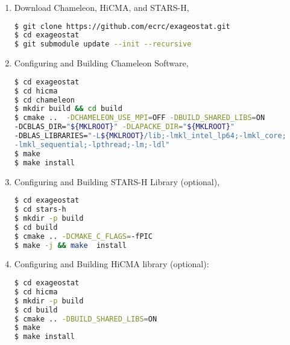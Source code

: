 \documentclass[
10pt, %
a4paper, %
oneside, %
headinclude,footinclude, %
BCOR5mm, %
]{scrartcl}
\begin{document}
\begin{enumerate}
%


\item
\noindent Download Chameleon, HiCMA, and STARS-H,
\begin{lstlisting}[language=bash]
$ git clone https://github.com/ecrc/exageostat.git
$ cd exageostat
$ git submodule update --init --recursive
\end{lstlisting}

\item
\noindent Configuring and Building Chameleon Software,
\begin{lstlisting}[language=bash]
$ cd exageostat
$ cd hicma
$ cd chameleon
$ mkdir build && cd build
$ cmake ..  -DCHAMELEON_USE_MPI=OFF -DBUILD_SHARED_LIBS=ON 
-DCBLAS_DIR="${MKLROOT}" -DLAPACKE_DIR="${MKLROOT}"
-DBLAS_LIBRARIES="-L${MKLROOT}/lib;-lmkl_intel_lp64;-lmkl_core; 
-lmkl_sequential;-lpthread;-lm;-ldl"
$ make 
$ make install
\end{lstlisting}


\item
\noindent Configuring and Building STARS-H Library (optional),
\begin{lstlisting}[language=bash]
$ cd exageostat
$ cd stars-h
$ mkdir -p build
$ cd build 
$ cmake .. -DCMAKE_C_FLAGS=-fPIC 
$ make -j && make  install
\end{lstlisting}



\item
\noindent Configuring and Building HiCMA library (optional):
\begin{lstlisting}[language=bash]
$ cd exageostat
$ cd hicma
$ mkdir -p build
$ cd build
$ cmake .. -DBUILD_SHARED_LIBS=ON
$ make 
$ make install
\end{lstlisting}
\end{enumerate}
\end{document}
